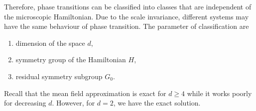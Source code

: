     Therefore, phase transitions can be classified into classes that are independent of the microscopic Hamiltonian. Due to the scale invariance, different systems may have the same behaviour of phase transition. The parameter of classification are 
    \begin{enumerate}
        \item dimension of the space $d$,
        \item symmetry group of the Hamiltonian $H$,
        \item residual symmetry subgroup $G_0$.
    \end{enumerate}
    Recall that the mean field approximation is exact for $d \geq 4$ while it works poorly for decreasing $d$. However, for $d = 2$, we have the exact solution.

